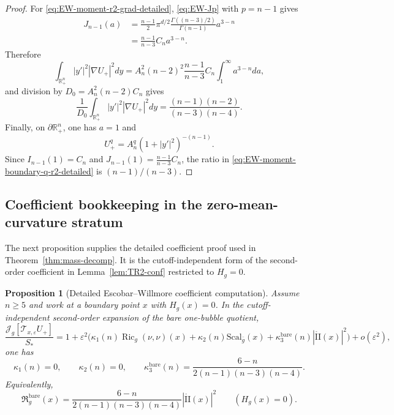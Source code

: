 \documentclass[11pt,reqno,a4paper]{amsart}
\newcommand{\R}{\mathbb{R}}
\DeclareMathOperator{\Ric}{Ric}
\numberwithin{equation}{section}
\theoremstyle{plain}
\newtheorem{proposition}[theorem]{Proposition}
\newcommand{\Scal}{\mathrm{Scal}}
\theoremstyle{remark}
\theoremstyle{plain}
\begin{document}
\begin{proof}
For \eqref{eq:EW-moment-r2-grad-detailed}, \eqref{eq:EW-Jp} with $p=n-1$ gives
\begin{align*}
J_{n-1}(a)
&=\frac{n-1}{2}\pi^{d/2}\frac{\Gamma((n-3)/2)}{\Gamma(n-1)}a^{3-n} \\
&=\frac{n-1}{n-3}C_na^{3-n}.
\end{align*}
Therefore
\[
\int_{\R^n_+}|y'|^2|\nabla U_+|^2dy
=A_n^2(n-2)^2\frac{n-1}{n-3}C_n\int_1^\infty a^{3-n}da,
\]
and division by $D_0=A_n^2(n-2)C_n$ gives
\[
\frac{1}{D_0}\int_{\R^n_+}|y'|^2|\nabla U_+|^2dy
=\frac{(n-1)(n-2)}{(n-3)(n-4)}.
\]
Finally, on $\partial\R^n_+$, one has $a=1$ and
\[
U_+^q=A_n^q(1+|y'|^2)^{-(n-1)}.
\]
Since $I_{n-1}(1)=C_n$ and $J_{n-1}(1)=\frac{n-1}{n-3}C_n$, the ratio in
\eqref{eq:EW-moment-boundary-q-r2-detailed} is $(n-1)/(n-3)$.
\end{proof}

\subsection*{Coefficient bookkeeping in the zero-mean-curvature stratum}

The next proposition supplies the detailed coefficient proof used in
Theorem~\ref{thm:mass-decomp}.  It is the cutoff-independent form of the
second-order coefficient in Lemma~\ref{lem:TR2-conf} restricted to $H_g=0$.

\begin{proposition}[Detailed Escobar--Willmore coefficient computation]
\label{prop:EW-coefficient-bookkeeping-detailed}
Assume $n\ge5$ and work at a boundary point $x$ with $H_g(x)=0$.  In the
cutoff-independent second-order expansion of the bare one-bubble quotient,
\[
\frac{\mathcal J_g[\mathcal T_{x,\varepsilon}U_+]}{S_\ast}
=1+\varepsilon^2\Big(
\kappa_1(n)\Ric_g(\nu,\nu)(x)
+\kappa_2(n)\Scal_{\bar g}(x)
+\kappa_3^{\mathrm{bare}}(n)|\mathring{\mathrm{II}}(x)|^2
\Big)+o(\varepsilon^2),
\]
one has
\[
\kappa_1(n)=0,
\qquad
\kappa_2(n)=0,
\qquad
\kappa_3^{\mathrm{bare}}(n)=
\frac{6-n}{2(n-1)(n-3)(n-4)}.
\]
Equivalently,
\[
\mathfrak R_g^{\mathrm{bare}}(x)
=\frac{6-n}{2(n-1)(n-3)(n-4)}
|\mathring{\mathrm{II}}(x)|^2
\qquad (H_g(x)=0).
\]
\end{proposition}
\end{document}
